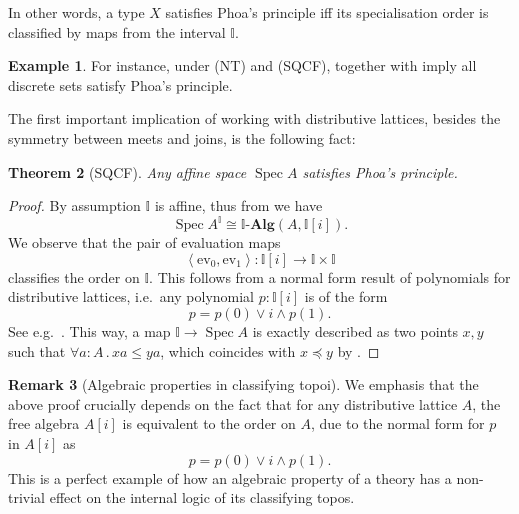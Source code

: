 \documentclass[12pt]{amsart}
\newtheorem{theorem}{Theorem}[section]
\theoremstyle{definition}
\newtheorem{example}[theorem]{Example}
\newtheorem{remark}[theorem]{Remark}
\newcommand{\mb}[1]{\mathbf{#1}}
\newcommand{\mbb}[1]{\mathbb{#1}}
\newcommand{\I}{\mbb I}
\newcommand{\alg}{\text{-}\mb{Alg}}
\newcommand{\pair}[1]{\left\langle#1\right\rangle}
\newcommand{\ev}{\mathrm{ev}}
\newcommand{\fa}[2]{\forall #1\!\colon\!\!#2\mathpunct{.}}
\newcommand{\spec}{\operatorname{Spec}}
\begin{document}

In other words, a type $X$ satisfies Phoa's principle iff its specialisation order is classified by maps from the interval $\I$.

\begin{example}
  For instance, under (NT) and (SQCF),  together with  imply all discrete sets satisfy Phoa's principle.
\end{example}

The first important implication of working with distributive lattices, besides the symmetry between meets and joins, is the following fact:

\begin{theorem}[SQCF]\label{thm:phoaaffine}
  Any affine space $\spec A$ satisfies Phoa's principle.
\end{theorem}
\begin{proof}
  By assumption $\I$ is affine, thus from  we have
  \[ \spec A^\I \cong \I\alg(A,\I[i]). \]
  We observe that the pair of evaluation maps
  \[ \pair{\ev_0,\ev_1} : \I[i] \to \I \times \I \]
  classifies the order on $\I$. This follows from a normal form result of polynomials for distributive lattices, i.e.\ any polynomial $p:\I[i]$ is of the form 
  \[ p = p(0) \vee i \wedge p(1). \]
  See e.g.~\cite[Thm. 10.11]{lausch2000algebra}. This way, a map $\I \to \spec A$ is exactly described as two points $x,y$ such that $\fa aA xa \le ya$, which coincides with $x \preceq y$ by .
\end{proof}

\begin{remark}[Algebraic properties in classifying topoi]\label{rem:normalalgebra}
  We emphasis that the above proof crucially depends on the fact that for any distributive lattice $A$, the free algebra $A[i]$ is equivalent to the order on $A$, due to the normal form for $p$ in $A[i]$ as 
  \[ p = p(0) \vee i \wedge p(1). \]
  This is a perfect example of how an algebraic property of a theory has a non-trivial effect on the internal logic of its classifying topos.
\end{remark}
\end{document}

